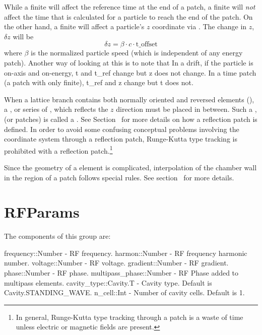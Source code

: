 While a finite  will affect the reference time at the end of a patch, a finite
 will {\em not} affect the time that is calculated for a particle to reach the end of
the patch. On the other hand, a finite  will affect a particle's $z$ coordinate via
. The change in $z$, $\delta z$ will be
\begin{equation}
  \delta z = \beta \cdot c \cdot \text{t_offset}
\end{equation}
where $\beta$ is the normalized particle speed (which is independent of any energy patch). Another
way of looking at this is to note that In a drift, if the particle is on-axis and on-energy, t and
t_ref change but z does not change. In a time patch (a patch with only  finite), t_ref
and z change but t does not.

When a lattice branch contains both normally oriented and reversed elements
(), a , or series of , which reflects the $z$ direction
must be placed in between. Such a , (or patches) is called a  .
See Section~ for more details on how a reflection patch is defined. In order
to avoid some confusing conceptual problems involving the coordinate system through a reflection
patch, Runge-Kutta type tracking is prohibited with a reflection patch.\footnote
  {
In general, Runge-Kutta type tracking through a patch is a waste of time unless electric or magnetic
fields are present.
  }

Since the geometry of a  element is complicated, interpolation of the chamber wall in the
region of a patch follows special rules. See section~ for more details.



\section{RFParams}
\label{s:rf.g}

The components of this group are:
\begin{example}
  frequency::Number         - RF frequency. 
  harmon::Number            - RF frequency harmonic number. 
  voltage::Number           - RF voltage. 
  gradient::Number          - RF gradient. 
  phase::Number             - RF phase. 
  multipass_phase::Number   - RF Phase added to multipass elements. 
  cavity_type::Cavity.T     - Cavity type. Default is Cavity.STANDING_WAVE. 
  n_cell::Int               - Number of cavity cells. Default is 1. 
\end{example}


